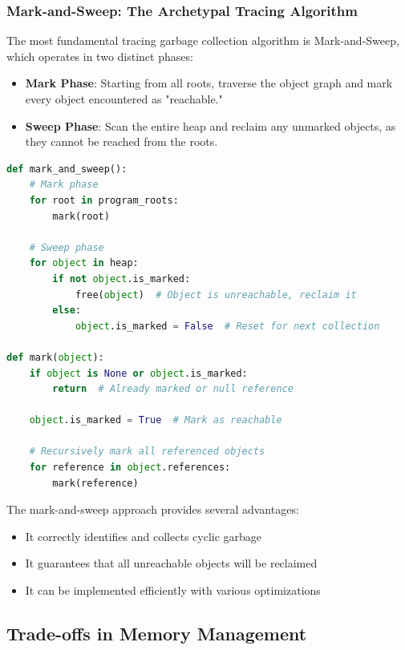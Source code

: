 \documentclass{article}
\begin{document}
\subsubsection{Mark-and-Sweep: The Archetypal Tracing Algorithm}

The most fundamental tracing garbage collection algorithm is Mark-and-Sweep, which operates in two distinct phases:

\begin{itemize}
    \item \textbf{Mark Phase}: Starting from all roots, traverse the object graph and mark every object encountered as "reachable."
    \item \textbf{Sweep Phase}: Scan the entire heap and reclaim any unmarked objects, as they cannot be reached from the roots.
\end{itemize}

\begin{lstlisting}[language=Python, caption=Mark-and-Sweep Algorithm, style=pythonstyle]
def mark_and_sweep():
    # Mark phase
    for root in program_roots:
        mark(root)
    
    # Sweep phase
    for object in heap:
        if not object.is_marked:
            free(object)  # Object is unreachable, reclaim it
        else:
            object.is_marked = False  # Reset for next collection

def mark(object):
    if object is None or object.is_marked:
        return  # Already marked or null reference
    
    object.is_marked = True  # Mark as reachable
    
    # Recursively mark all referenced objects
    for reference in object.references:
        mark(reference)
\end{lstlisting}

The mark-and-sweep approach provides several advantages:
\begin{itemize}
    \item It correctly identifies and collects cyclic garbage
    \item It guarantees that all unreachable objects will be reclaimed
    \item It can be implemented efficiently with various optimizations
\end{itemize}



\subsection{Trade-offs in Memory Management}
\end{document}
